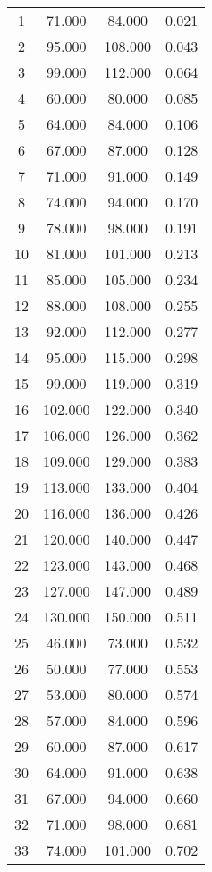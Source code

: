 % 
\begin{tabular}{cccc}
  \hline
  \hline
1 & 71.000 & 84.000 & 0.021 \\ 
  2 & 95.000 & 108.000 & 0.043 \\ 
  3 & 99.000 & 112.000 & 0.064 \\ 
  4 & 60.000 & 80.000 & 0.085 \\ 
  5 & 64.000 & 84.000 & 0.106 \\ 
  6 & 67.000 & 87.000 & 0.128 \\ 
  7 & 71.000 & 91.000 & 0.149 \\ 
  8 & 74.000 & 94.000 & 0.170 \\ 
  9 & 78.000 & 98.000 & 0.191 \\ 
  10 & 81.000 & 101.000 & 0.213 \\ 
  11 & 85.000 & 105.000 & 0.234 \\ 
  12 & 88.000 & 108.000 & 0.255 \\ 
  13 & 92.000 & 112.000 & 0.277 \\ 
  14 & 95.000 & 115.000 & 0.298 \\ 
  15 & 99.000 & 119.000 & 0.319 \\ 
  16 & 102.000 & 122.000 & 0.340 \\ 
  17 & 106.000 & 126.000 & 0.362 \\ 
  18 & 109.000 & 129.000 & 0.383 \\ 
  19 & 113.000 & 133.000 & 0.404 \\ 
  20 & 116.000 & 136.000 & 0.426 \\ 
  21 & 120.000 & 140.000 & 0.447 \\ 
  22 & 123.000 & 143.000 & 0.468 \\ 
  23 & 127.000 & 147.000 & 0.489 \\ 
  24 & 130.000 & 150.000 & 0.511 \\ 
  25 & 46.000 & 73.000 & 0.532 \\ 
  26 & 50.000 & 77.000 & 0.553 \\ 
  27 & 53.000 & 80.000 & 0.574 \\ 
  28 & 57.000 & 84.000 & 0.596 \\ 
  29 & 60.000 & 87.000 & 0.617 \\ 
  30 & 64.000 & 91.000 & 0.638 \\ 
  31 & 67.000 & 94.000 & 0.660 \\ 
  32 & 71.000 & 98.000 & 0.681 \\ 
  33 & 74.000 & 101.000 & 0.702 \\ 

\end{tabular}
